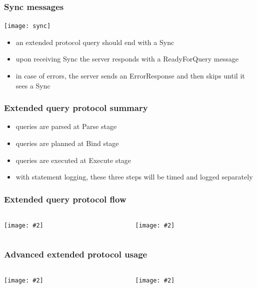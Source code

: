 \documentclass{beamer}
\newcommand{\mscdiagram}[2][1]{
  \begin{center}
    \texttt{[image: \#2]}
  \end{center}
}
\begin{document}
\begin{frame}
  \frametitle{Sync messages}

  \begin{center}
    \texttt{[image: sync]}
  \end{center}

  \begin{itemize}
  \item an extended protocol query should end with a Sync
  \item upon receiving Sync the server responds with a ReadyForQuery message
  \item in case of errors, the server sends an ErrorResponse and then skips
    until it sees a Sync
  \end{itemize}
\end{frame}

\begin{frame}
  \frametitle{Extended query protocol summary}

  \begin{itemize}
  \item queries are \alert{parsed} at Parse stage
  \item queries are \alert{planned} at Bind stage
  \item queries are \alert{executed} at Execute stage
  \item with statement logging, these three steps will be \alert{timed} and
    \alert{logged separately}
  \end{itemize}
\end{frame}

\begin{frame}
  \frametitle{Extended query protocol flow}

  \begin{columns}[onlytextwidth]
    \begin{column}{0.5\textwidth}
      \mscdiagram[0.4]{extended-query-protocol-1}
    \end{column}
    \begin{column}{0.5\textwidth}
      \mscdiagram[0.4]{extended-query-protocol-2}
    \end{column}
  \end{columns}
\end{frame}

\begin{frame}
  \frametitle{Advanced extended protocol usage}

  \begin{columns}[onlytextwidth]
    \begin{column}{0.5\textwidth}
      \mscdiagram[0.4]{extended-query-protocol-adv-1}
    \end{column}
    \begin{column}{0.5\textwidth}
      \mscdiagram[0.4]{extended-query-protocol-adv-2}
    \end{column}
  \end{columns}
\end{frame}
\end{document}
